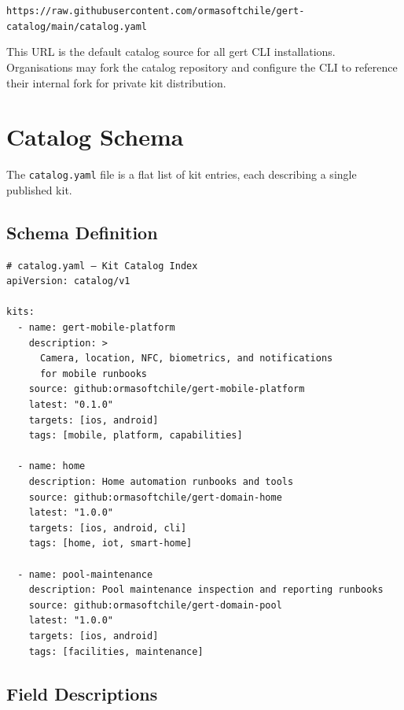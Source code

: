 \begin{center}
\texttt{https://raw.githubusercontent.com/ormasoftchile/gert-catalog/main/catalog.yaml}
\end{center}

This URL is the default catalog source for all gert CLI installations. Organisations may fork the catalog repository and configure the CLI to reference their internal fork for private kit distribution.

\section{Catalog Schema}
\label{sec:catalog-schema}

The \texttt{catalog.yaml} file is a flat list of kit entries, each describing a single published kit.

\subsection{Schema Definition}

\begin{verbatim}
# catalog.yaml — Kit Catalog Index
apiVersion: catalog/v1

kits:
  - name: gert-mobile-platform
    description: >
      Camera, location, NFC, biometrics, and notifications 
      for mobile runbooks
    source: github:ormasoftchile/gert-mobile-platform
    latest: "0.1.0"
    targets: [ios, android]
    tags: [mobile, platform, capabilities]

  - name: home
    description: Home automation runbooks and tools
    source: github:ormasoftchile/gert-domain-home
    latest: "1.0.0"
    targets: [ios, android, cli]
    tags: [home, iot, smart-home]

  - name: pool-maintenance
    description: Pool maintenance inspection and reporting runbooks
    source: github:ormasoftchile/gert-domain-pool
    latest: "1.0.0"
    targets: [ios, android]
    tags: [facilities, maintenance]
\end{verbatim}

\subsection{Field Descriptions}

